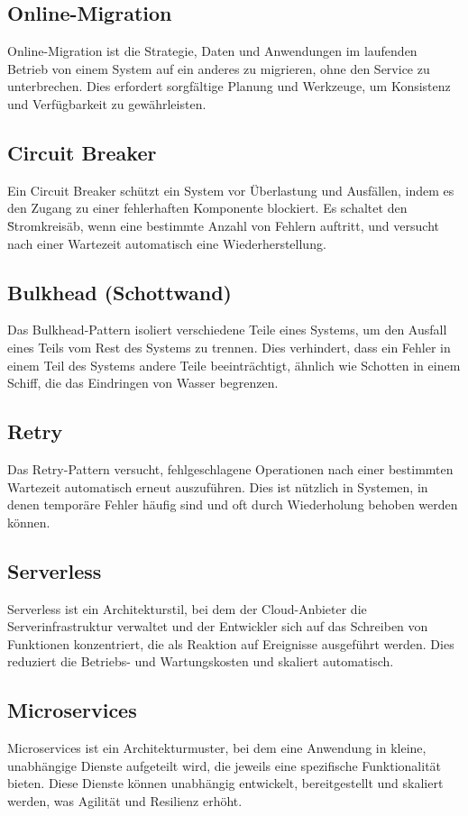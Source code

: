 \subsection{Online-Migration}
Online-Migration ist die Strategie, Daten und Anwendungen im laufenden Betrieb von einem System auf ein anderes zu migrieren, ohne den Service zu unterbrechen. Dies erfordert sorgfältige Planung und Werkzeuge, um Konsistenz und Verfügbarkeit zu gewährleisten.

\subsection{Circuit Breaker}
Ein Circuit Breaker schützt ein System vor Überlastung und Ausfällen, indem es den Zugang zu einer fehlerhaften Komponente blockiert. Es schaltet den \"Stromkreis\" ab, wenn eine bestimmte Anzahl von Fehlern auftritt, und versucht nach einer Wartezeit automatisch eine Wiederherstellung.

\subsection{Bulkhead (Schottwand)}
Das Bulkhead-Pattern isoliert verschiedene Teile eines Systems, um den Ausfall eines Teils vom Rest des Systems zu trennen. Dies verhindert, dass ein Fehler in einem Teil des Systems andere Teile beeinträchtigt, ähnlich wie Schotten in einem Schiff, die das Eindringen von Wasser begrenzen.

\subsection{Retry}
Das Retry-Pattern versucht, fehlgeschlagene Operationen nach einer bestimmten Wartezeit automatisch erneut auszuführen. Dies ist nützlich in Systemen, in denen temporäre Fehler häufig sind und oft durch Wiederholung behoben werden können.

\subsection{Serverless}
Serverless ist ein Architekturstil, bei dem der Cloud-Anbieter die Serverinfrastruktur verwaltet und der Entwickler sich auf das Schreiben von Funktionen konzentriert, die als Reaktion auf Ereignisse ausgeführt werden. Dies reduziert die Betriebs- und Wartungskosten und skaliert automatisch.

\subsection{Microservices}
Microservices ist ein Architekturmuster, bei dem eine Anwendung in kleine, unabhängige Dienste aufgeteilt wird, die jeweils eine spezifische Funktionalität bieten. Diese Dienste können unabhängig entwickelt, bereitgestellt und skaliert werden, was Agilität und Resilienz erhöht.

